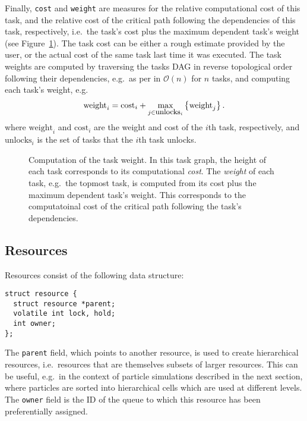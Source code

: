 \documentclass[fleqn,10pt]{wlpeerj}
\newcommand{\fig}[1]
    {Figure~\ref{fig:#1}}
\begin{document}
Finally, {\tt cost} and {\tt weight} are measures
for the relative computational cost of this task, and the
relative cost of the critical path following the
dependencies of this task, respectively, i.e.~the task's cost
plus the maximum dependent task's weight (see \fig{TaskWeight}).
The task cost can be either a rough estimate provided by the user,
or the actual cost of the same task last time it was executed.
The task weights are computed by traversing
the tasks DAG in reverse topological order following their dependencies,
e.g.~as per \cite{ref:Kahn1962} in $\mathcal O(n)$ for $n$ tasks,
and computing each task's weight, e.g.
\begin{equation*}
  \mbox{weight}_i = \mbox{cost}_i + \max_{j \in \mbox{\small unlocks}_i}\left\{\mbox{weight}_j\right\}.
\end{equation*}
\noindent where $\mbox{weight}_i$ and $\mbox{cost}_i$ are the
weight and cost of the $i$th task, respectively, and 
$\mbox{unlocks}_i$ is the set of tasks that the $i$th task
unlocks.

\begin{figure}
    \centerline{}
    \caption{Computation of the task weight.
      In this task graph, the height of each task corresponds to its
      computational {\em cost}.
      The {\em weight} of each task, e.g.~the topmost task,
      is computed from its cost plus
      the maximum dependent task's weight.
      This corresponds to the computatoinal cost of the critical
      path following the task's dependencies.}
    \label{fig:TaskWeight}
\end{figure}


\subsection{Resources}

Resources consist of the following data structure:
\begin{center}\begin{minipage}{0.9\textwidth}
    \begin{lstlisting}
struct resource {
  struct resource *parent;
  volatile int lock, hold;
  int owner;
};
    \end{lstlisting}
\end{minipage}\end{center}

The {\tt parent} field, which points to another resource, is
used to create hierarchical resources, i.e.~resources
that are themselves subsets of larger resources.
This can be useful, e.g.~in the context of particle simulations
described in the next section, where particles are sorted
into hierarchical cells which are used at different levels.
The {\tt owner} field is the ID of the queue to which this
resource has been preferentially assigned.
\end{document}

